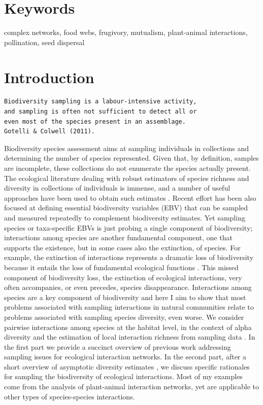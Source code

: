 \documentclass[12pt]{article}
\begin{document}
\section*{Keywords}
complex networks, food webs, frugivory, mutualism, plant-animal interactions, pollination, seed dispersal
\section*{Introduction}
\label{introduction}
\begin{verbatim}
Biodiversity sampling is a labour-intensive activity,   
and sampling is often not sufficient to detect all or   
even most of the species present in an assemblage.   
Gotelli & Colwell (2011).
\end{verbatim}

\linenumbers
Biodiversity species assessment aims at sampling individuals in collections and determining the number of species represented. Given that, by definition, samples are incomplete, these collections do not enumerate the species actually present. The ecological literature dealing with robust estimators of species richness and diversity in collections of individuals is immense, and a number of useful approaches have been used to obtain such estimates \citep{Magurran:1988mm,Gotelli:2001uo,Colwell:2004fi,Hortal:2006dc,Colwell:2009gv,Gotelli:2011tb,Chao:2014wm}. Recent effort has been also focused at defining essential biodiversity variables (EBV) \citep{Pereira:2013ji} that can be sampled and measured repeatedly to complement biodiversity estimates. Yet sampling species or taxa-specific EBVs is just probing a single component of biodiversity; interactions among species are another fundamental component, one that supports the existence, but in some cases also the extinction, of species. For example, the extinction of interactions represents a dramatic loss of biodiversity because it entails the loss of fundamental ecological functions \citep{ValienteBanuet:2014bw}. This missed component of biodiversity loss, the extinction of ecological interactions, very often accompanies, or even precedes, species disappearance. Interactions among species are a key component of biodiversity and here I aim to show that most problems associated with sampling interactions in natural communities relate to problems associated with sampling species diversity, even worse. We consider pairwise interactions among species at the habitat level, in the context of alpha diversity and the estimation of local interaction richness from sampling data \citep{Chao:2014wm}. In the first part we provide a succinct overview of previous work addressing sampling issues for ecological interaction networks. In the second part, after a short overview of asymptotic diversity estimates \citep{Gotelli:2001uo}, we discuss specific rationales for sampling the biodiversity of ecological interactions. Most of my examples come from the analysis of plant-animal interaction networks, yet are applicable to other types of species-species interactions.
\end{document}
